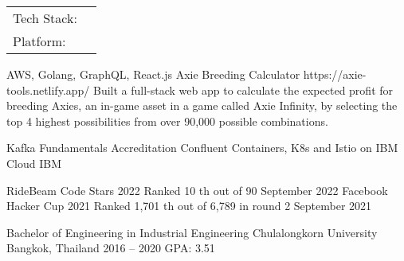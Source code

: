 \documentclass[]{awesome-cv}
\begin{document}
\vspace{-4mm}
\begin{cventries}
	\cventry
	{}
	{\def\arraystretch{1.15}{\begin{tabular}{ l l }
				Tech Stack: & {\skill{ Golang, MongoDB, SQL, React.js, TypeScript}} \\
				Platform:   & {\skill{ AWS, OpenShift, Docker, Control-M}}          \\
			\end{tabular}}}
	{}
	{}
	{}
\end{cventries}

\vspace{-8mm}
\begin{cventries}
	\cventry
	{AWS, Golang, GraphQL, React.js}
	{Axie Breeding Calculator}
	{https://axie-tools.netlify.app/}
	{}
	{Built a full-stack web app to calculate the expected profit for breeding Axies, an in-game asset in a game called Axie Infinity, by selecting the top 4 highest possibilities from over 90,000 possible combinations.}
\end{cventries}


\begin{cvcertificates}
	\cvcertificate
	{Kafka Fundamentals Accreditation}
	{Confluent}
	\cvcertificate
	{Containers, K8s and Istio on IBM Cloud}
	{IBM}
\end{cvcertificates}

\begin{cvhonors}
	\cvhonor
	{RideBeam Code Stars 2022}
	{Ranked 10 th out of 90}
	{September 2022}
	\cvhonor
	{Facebook Hacker Cup 2021}
	{Ranked 1,701 th out of 6,789 in round 2}
	{September 2021}
\end{cvhonors}

\begin{cventries}
	\cventry
	{Bachelor of Engineering in Industrial Engineering}
	{Chulalongkorn University}
	{Bangkok, Thailand}
	{2016 – 2020}
	{GPA: 3.51}
\end{cventries}

\vspace{-2mm}
\
\end{document}
